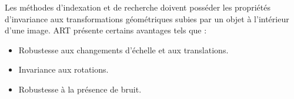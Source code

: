 Les méthodes d’indexation et de recherche doivent posséder les propriétés d’invariance aux
transformations géométriques subies par un objet à l’intérieur d’une image. ART présente certains avantages tels que :
\begin{itemize}
	\item  Robustesse aux changements d’échelle et aux translations.
	\item Invariance aux rotations.
	\item  Robustesse à la présence de bruit.
\end{itemize}

%
%

%
% 
%   
%
%


